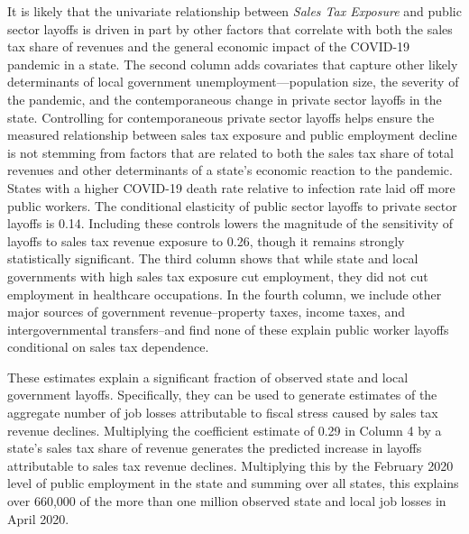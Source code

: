 It is likely that the univariate relationship between \emph{Sales Tax Exposure} and public sector layoffs is driven in part by other factors that correlate with both the sales tax share of revenues and the general economic impact of the COVID-19 pandemic in a state. The second column adds covariates that capture other likely determinants of local government unemployment---population size, the severity of the pandemic, and the contemporaneous change in private sector layoffs in the state. Controlling for contemporaneous private sector layoffs helps ensure the measured relationship between sales tax exposure and public employment decline is not stemming from factors that are related to both the sales tax share of total revenues and other determinants of a state's economic reaction to the pandemic.  States with a higher COVID-19 death rate relative to infection rate laid off more public workers. The conditional elasticity of public sector layoffs to private sector layoffs is 0.14. Including these controls lowers the magnitude of the sensitivity of layoffs to sales tax revenue exposure to 0.26, though it remains strongly statistically significant. The third column shows that while state and local governments with high sales tax exposure cut employment, they did not cut employment in healthcare occupations.  In the fourth column, we include other major sources of government revenue--property taxes, income taxes, and intergovernmental transfers--and find none of these explain public worker layoffs conditional on sales tax dependence. 

These estimates explain a significant fraction of observed state and local government layoffs. Specifically, they can be used to generate estimates of the aggregate number of job losses attributable to fiscal stress caused by sales tax revenue declines. Multiplying the coefficient estimate of 0.29 in Column 4 by a state's sales tax share of revenue generates the predicted increase in layoffs attributable to sales tax revenue declines. Multiplying this by the February 2020 level of public employment in the state and summing over all states, this explains over 660,000 of the more than one million observed state and local job losses in April 2020.  

